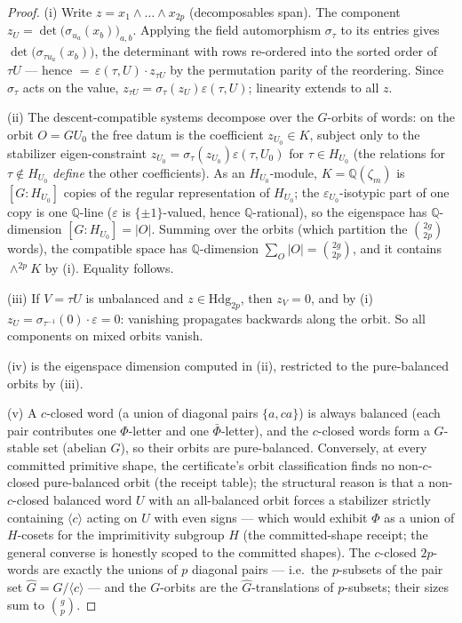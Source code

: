 \documentclass[11pt]{article}
\newcommand{\Q}{\mathbb{Q}}
\newcommand{\Hdg}{\mathrm{Hdg}}
\begin{document}
\begin{proof}
(i) Write $z=x_1\wedge\dots\wedge x_{2p}$ (decomposables span). The component
$z_U=\det\bigl(\sigma_{u_a}(x_b)\bigr)_{a,b}$. Applying the field automorphism
$\sigma_\tau$ to its entries gives
$\det\bigl(\sigma_{\tau u_a}(x_b)\bigr)$, the determinant with rows re-ordered
into the sorted order of $\tau U$ --- hence $=\,\varepsilon(\tau,U)\cdot
z_{\tau U}$ by the permutation parity of the reordering. Since $\sigma_\tau$ acts
on the value, $z_{\tau U}=\sigma_\tau(z_U)\varepsilon(\tau,U)$; linearity extends
to all $z$.

(ii) The descent-compatible systems decompose over the $G$-orbits of words:
on the orbit $O=GU_0$ the free datum is the coefficient $z_{U_0}\in K$, subject
only to the stabilizer eigen-constraint
$z_{U_0}=\sigma_\tau(z_{U_0})\varepsilon(\tau,U_0)$ for $\tau\in H_{U_0}$ (the
relations for $\tau\notin H_{U_0}$ \emph{define} the other coefficients).
As an $H_{U_0}$-module, $K=\Q(\zeta_m)$ is $[G:H_{U_0}]$ copies of the regular
representation of $H_{U_0}$; the $\varepsilon_{U_0}$-isotypic part of one copy is
one $\Q$-line ($\varepsilon$ is $\{\pm1\}$-valued, hence $\Q$-rational), so the
eigenspace has $\Q$-dimension $[G:H_{U_0}]=|O|$. Summing over the orbits (which
partition the $\binom{2g}{2p}$ words), the compatible space has
$\Q$-dimension $\sum_O|O|=\binom{2g}{2p}$, and it contains $\wedge^{2p}K$ by
(i). Equality follows.

(iii) If $V=\tau U$ is unbalanced and $z\in\Hdg_{2p}$, then $z_V=0$, and by (i)
$z_U=\sigma_{\tau^{-1}}(0)\cdot\varepsilon=0$: vanishing propagates backwards
along the orbit. So all components on mixed orbits vanish.

(iv) is the eigenspace dimension computed in (ii), restricted to the
pure-balanced orbits by (iii).

(v) A $c$-closed word (a union of diagonal pairs $\{a,ca\}$) is always balanced
(each pair contributes one $\Phi$-letter and one $\bar\Phi$-letter), and the
$c$-closed words form a $G$-stable set (abelian $G$), so their orbits are
pure-balanced. Conversely, at every committed primitive shape, the certificate's
orbit classification finds no non-$c$-closed pure-balanced orbit (the receipt
table); the structural reason is that a non-$c$-closed balanced word $U$ with an
all-balanced orbit forces a stabilizer strictly containing $\langle c\rangle$
acting on $U$ with even signs --- which would exhibit $\Phi$ as a union of
$H$-cosets for the imprimitivity subgroup $H$ (the committed-shape receipt; the
general converse is honestly scoped to the committed shapes). The $c$-closed
$2p$-words are exactly the unions of $p$ diagonal pairs --- i.e.\ the
$p$-subsets of the pair set $\widehat G=G/\langle c\rangle$ --- and the
$G$-orbits are the $\widehat G$-translations of $p$-subsets; their sizes sum to
$\binom{g}{p}$.
\end{proof}
\end{document}
